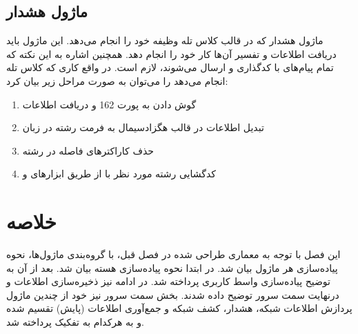 \subsection{ماژول هشدار}

ماژول هشدار که در قالب کلاس تله وظیفه خود را انجام می‌دهد. این ماژول باید دریافت اطلاعات و تفسیر آن‌ها کار خود را انجام دهد. همچنین اشاره به این نکته که تمام پیام‌های  با  کدگذاری و ارسال می‌شوند، لازم است. در واقع کاری که کلاس تله انجام می‌دهد را می‌توان به صورت مراحل زیر بیان کرد:

\begin{enumerate}
    \item گوش دادن به پورت 162 و دریافت اطلاعات
    \item تبدیل اطلاعات در قالب هگزادسیمال به فرمت رشته در زبان 
    \item حذف کاراکترهای فاصله در رشته
    \item کدگشایی رشته مورد نظر با  از طریق ابزارهای  و 

\end{enumerate}


\section{خلاصه}

این فصل با توجه به معماری طراحی شده در فصل قبل، با گروه‌بندی ماژول‌ها، نحوه پیاده‌سازی هر ماژول بیان شد. در ابتدا نحوه پیاده‌سازی هسته  بیان شد. بعد از آن به توضیح پیاده‌سازی واسط کاربری پرداخته شد. در ادامه نیز ذخیره‌سازی اطلاعات و درنهایت سمت سرور توضیح داده شدند. بخش سمت سرور نیز خود از چندین ماژول پردازش اطلاعات شبکه، هشدار، کشف شبکه و جمع‌آوری اطلاعات (پایش) تقسیم شده و به هرکدام به تفکیک پرداخته شد.